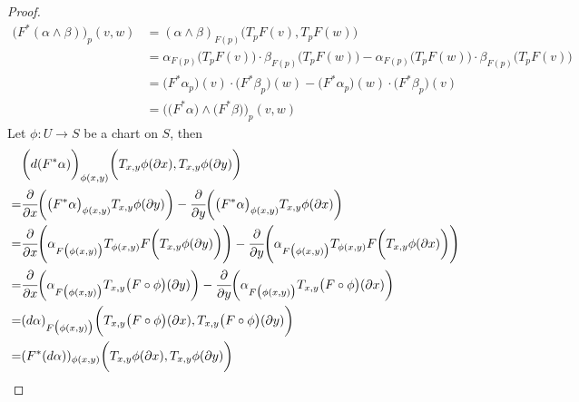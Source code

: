 \documentclass[10pt]{article}
\begin{document}
            \begin{proof}
                \begin{equation*}
                    \begin{aligned}
                        \bigg(F^*(\alpha\wedge\beta)\bigg)_p(v, w) &= (\alpha\wedge\beta)_{F(p)}\bigg( T_pF(v), T_pF(w) \bigg) \\
                        &= \alpha_{F(p)}\bigg( T_pF(v) \bigg)\cdot\beta_{F(p)}\bigg( T_pF(w) \bigg) - \alpha_{F(p)}\bigg( T_pF(w) \bigg)\cdot\beta_{F(p)}\bigg( T_pF(v) \bigg) \\
                        &= \big(F^*\alpha_p \big)(v)\cdot\big(F^*\beta_p \big)(w) - \big(F^*\alpha_p \big)(w)\cdot\big(F^*\beta_p \big)(v) \\
                        &= \bigg(\big(F^*\alpha\big)\wedge\big(F^*\beta\big)\bigg)_p(v,w)
                    \end{aligned}
                \end{equation*}
                Let $\phi: U\rightarrow S$ be a chart on $S$, then
                \begin{equation*}
                    \begin{aligned}
                        &\bigg( d(F^*\alpha) \bigg)_{\phi(x,y)}\bigg( T_{x,y}\phi(\partial x), T_{x,y}\phi(\partial y) \bigg) \\
                        = &\cfrac{\partial}{\partial x}\bigg( \big(F^*\alpha\big)_{\phi(x,y)} T_{x,y}\phi(\partial y) \bigg) - \cfrac{\partial}{\partial y}\bigg( \big(F^*\alpha\big)_{\phi(x,y)} T_{x,y}\phi(\partial x) \bigg) \\
                        = &\cfrac{\partial}{\partial x}\Bigg( \alpha_{F\big(\phi(x,y)\big)} T_{\phi(x,y)}F\bigg(T_{x,y}\phi(\partial y)\bigg) \Bigg) - \cfrac{\partial}{\partial y}\Bigg( \alpha_{F\big(\phi(x,y)\big)} T_{\phi(x,y)}F\bigg(T_{x,y}\phi(\partial x)\bigg) \Bigg) \\
                        = &\cfrac{\partial}{\partial x}\bigg( \alpha_{F\big(\phi(x,y)\big)} T_{x,y}\big(F\circ\phi\big)(\partial y) \bigg) - \cfrac{\partial}{\partial y}\bigg( \alpha_{F\big(\phi(x,y)\big)} T_{x,y}\big(F\circ\phi\big)(\partial x) \bigg) \\
                        = &(d\alpha)_{F\big(\phi(x,y)\big)}\bigg( T_{x,y}\big(F\circ\phi\big)(\partial x), T_{x,y}\big(F\circ\phi\big)(\partial y)\bigg) \\
                        = &(F^*(d\alpha))_{\phi(x,y)}\bigg( T_{x,y}\phi(\partial x), T_{x,y}\phi(\partial y)\bigg)
                    \end{aligned}
                \end{equation*}
            \end{proof}
\end{document}
